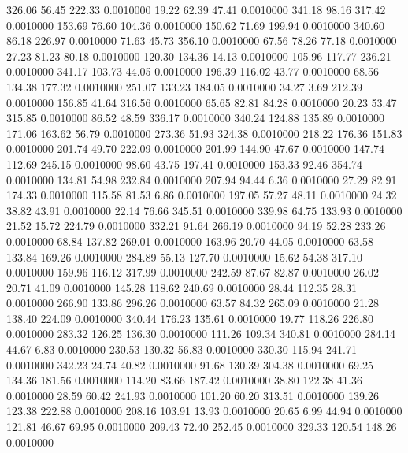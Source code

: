  326.06   56.45  222.33   0.0010000
  19.22   62.39   47.41   0.0010000
 341.18   98.16  317.42   0.0010000
 153.69   76.60  104.36   0.0010000
 150.62   71.69  199.94   0.0010000
 340.60   86.18  226.97   0.0010000
  71.63   45.73  356.10   0.0010000
  67.56   78.26   77.18   0.0010000
  27.23   81.23   80.18   0.0010000
 120.30  134.36   14.13   0.0010000
 105.96  117.77  236.21   0.0010000
 341.17  103.73   44.05   0.0010000
 196.39  116.02   43.77   0.0010000
  68.56  134.38  177.32   0.0010000
 251.07  133.23  184.05   0.0010000
  34.27    3.69  212.39   0.0010000
 156.85   41.64  316.56   0.0010000
  65.65   82.81   84.28   0.0010000
  20.23   53.47  315.85   0.0010000
  86.52   48.59  336.17   0.0010000
 340.24  124.88  135.89   0.0010000
 171.06  163.62   56.79   0.0010000
 273.36   51.93  324.38   0.0010000
 218.22  176.36  151.83   0.0010000
 201.74   49.70  222.09   0.0010000
 201.99  144.90   47.67   0.0010000
 147.74  112.69  245.15   0.0010000
  98.60   43.75  197.41   0.0010000
 153.33   92.46  354.74   0.0010000
 134.81   54.98  232.84   0.0010000
 207.94   94.44    6.36   0.0010000
  27.29   82.91  174.33   0.0010000
 115.58   81.53    6.86   0.0010000
 197.05   57.27   48.11   0.0010000
  24.32   38.82   43.91   0.0010000
  22.14   76.66  345.51   0.0010000
 339.98   64.75  133.93   0.0010000
  21.52   15.72  224.79   0.0010000
 332.21   91.64  266.19   0.0010000
  94.19   52.28  233.26   0.0010000
  68.84  137.82  269.01   0.0010000
 163.96   20.70   44.05   0.0010000
  63.58  133.84  169.26   0.0010000
 284.89   55.13  127.70   0.0010000
  15.62   54.38  317.10   0.0010000
 159.96  116.12  317.99   0.0010000
 242.59   87.67   82.87   0.0010000
  26.02   20.71   41.09   0.0010000
 145.28  118.62  240.69   0.0010000
  28.44  112.35   28.31   0.0010000
 266.90  133.86  296.26   0.0010000
  63.57   84.32  265.09   0.0010000
  21.28  138.40  224.09   0.0010000
 340.44  176.23  135.61   0.0010000
  19.77  118.26  226.80   0.0010000
 283.32  126.25  136.30   0.0010000
 111.26  109.34  340.81   0.0010000
 284.14   44.67    6.83   0.0010000
 230.53  130.32   56.83   0.0010000
 330.30  115.94  241.71   0.0010000
 342.23   24.74   40.82   0.0010000
  91.68  130.39  304.38   0.0010000
  69.25  134.36  181.56   0.0010000
 114.20   83.66  187.42   0.0010000
  38.80  122.38   41.36   0.0010000
  28.59   60.42  241.93   0.0010000
 101.20   60.20  313.51   0.0010000
 139.26  123.38  222.88   0.0010000
 208.16  103.91   13.93   0.0010000
  20.65    6.99   44.94   0.0010000
 121.81   46.67   69.95   0.0010000
 209.43   72.40  252.45   0.0010000
 329.33  120.54  148.26   0.0010000
